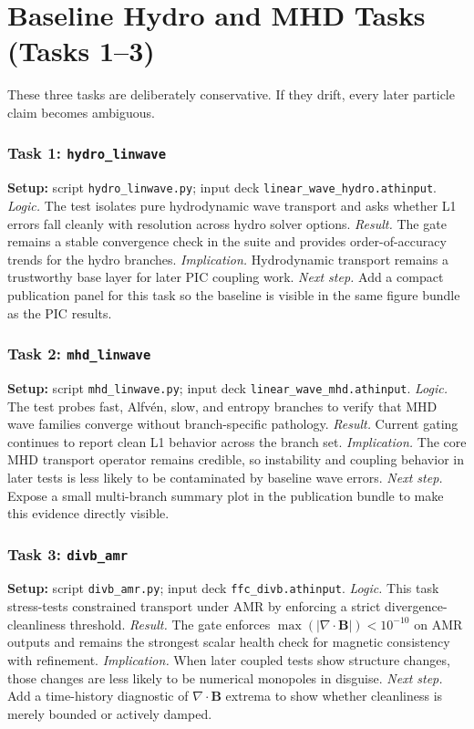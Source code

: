 \documentclass[twocolumn]{aastex701}
\newcommand{\logic}[1]{\textit{Logic.} #1}
\newcommand{\result}[1]{\textit{Result.} #1}
\newcommand{\implication}[1]{\textit{Implication.} #1}
\newcommand{\nextstep}[1]{\textit{Next step.} #1}
\begin{document}
\section{Baseline Hydro and MHD Tasks (Tasks 1--3)}

These three tasks are deliberately conservative. If they drift, every later
particle claim becomes ambiguous.

\subsubsection*{Task 1: \texttt{hydro\_linwave}}
\textbf{Setup:} script \texttt{hydro\_linwave.py}; input deck
\texttt{linear\_wave\_hydro.athinput}. \logic{The test isolates pure
hydrodynamic wave transport and asks whether L1 errors fall cleanly with
resolution across hydro solver options.} \result{The gate remains a stable
convergence check in the suite and provides order-of-accuracy trends for the
hydro branches.} \implication{Hydrodynamic transport remains a trustworthy base
layer for later PIC coupling work.} \nextstep{Add a compact publication panel
for this task so the baseline is visible in the same figure bundle as the PIC
results.}

\subsubsection*{Task 2: \texttt{mhd\_linwave}}
\textbf{Setup:} script \texttt{mhd\_linwave.py}; input deck
\texttt{linear\_wave\_mhd.athinput}. \logic{The test probes fast,
Alfv\'en, slow, and entropy branches to verify that MHD wave families converge
without branch-specific pathology.} \result{Current gating continues to report
clean L1 behavior across the branch set.} \implication{The core MHD transport
operator remains credible, so instability and coupling behavior in later tests
is less likely to be contaminated by baseline wave errors.} \nextstep{Expose a
small multi-branch summary plot in the publication bundle to make this evidence
directly visible.}

\subsubsection*{Task 3: \texttt{divb\_amr}}
\textbf{Setup:} script \texttt{divb\_amr.py}; input deck
\texttt{ffc\_divb.athinput}. \logic{This task stress-tests constrained
transport under AMR by enforcing a strict divergence-cleanliness threshold.}
\result{The gate enforces $\max(|\nabla\cdot\mathbf{B}|) < 10^{-10}$ on AMR
outputs and remains the strongest scalar health check for magnetic consistency
with refinement.} \implication{When later coupled tests show structure changes,
those changes are less likely to be numerical monopoles in disguise.}
\nextstep{Add a time-history diagnostic of $\nabla\cdot\mathbf{B}$ extrema to
show whether cleanliness is merely bounded or actively damped.}
\end{document}
